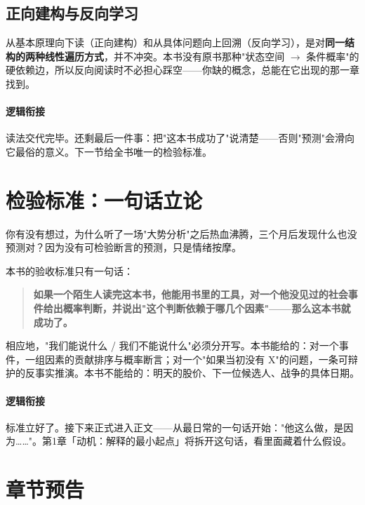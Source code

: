 \documentclass[../../main2.tex]{subfiles}
\begin{document}
	\subsection{正向建构与反向学习}
	从基本原理向下读（正向建构）和从具体问题向上回溯（反向学习），是对\textbf{同一结构的两种线性遍历方式}，并不冲突。本书没有原书那种"状态空间 $\rightarrow$ 条件概率"的硬依赖边，所以反向阅读时不必担心踩空——你缺的概念，总能在它出现的那一章找到。

	\paragraph*{逻辑衔接}
	读法交代完毕。还剩最后一件事：把"这本书成功了"说清楚——否则"预测"会滑向它最俗的意义。下一节给全书唯一的检验标准。

	\section{检验标准：一句话立论}

	你有没有想过，为什么听了一场"大势分析"之后热血沸腾，三个月后发现什么也没预测对？因为没有可检验断言的预测，只是情绪按摩。

	本书的验收标准只有一句话：

	\begin{quote}
		\textbf{如果一个陌生人读完这本书，他能用书里的工具，对一个他没见过的社会事件给出概率判断，并说出"这个判断依赖于哪几个因素"——那么这本书就成功了。}
	\end{quote}

	相应地，"我们能说什么 / 我们不能说什么"必须分开写。本书能给的：对一个事件，一组因素的贡献排序与概率断言；对一个"如果当初没有 X"的问题，一条可辩护的反事实推演。本书不能给的：明天的股价、下一位候选人、战争的具体日期。

	\paragraph*{逻辑衔接}
	标准立好了。接下来正式进入正文——从最日常的一句话开始："他这么做，是因为……"。第1章「动机：解释的最小起点」将拆开这句话，看里面藏着什么假设。

	\section{章节预告}
\end{document}
